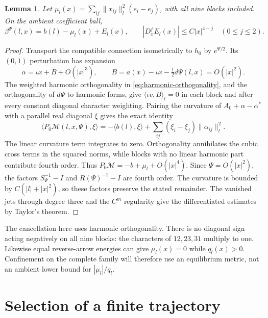 \documentclass[11pt]{amsart}
\newtheorem{lemma}[theorem]{Lemma}
\theoremstyle{definition}
\theoremstyle{remark}
\begin{document}
\begin{lemma}\label{lem:quartic-field}
Let $\mu_l(x)=\sum_{ij}\|x_{ij}\|_l^2(e_i-e_j)$, with all nine
blocks included. On the ambient coefficient ball,
\begin{equation}\label{eq:field-expansion}
 \beta^\Psi(l,x)=b(l)-\mu_l(x)+E_l(x),\qquad
 |D_x^jE_l(x)|\le C|x|^{4-j}\quad(0\le j\le2).
\end{equation}
\end{lemma}
\begin{proof}
Transport the compatible connection isometrically to $h_0$ by
$e^{\Psi/2}$. Its $(0,1)$ perturbation has expansion
\[
 \alpha=\iota x+B+O(|x|^3),\qquad
 B=a(x)-\iota x-\tfrac12d\Psi(l,x)=O(|x|^2).
\]
The weighted harmonic orthogonality in
\eqref{eq:harmonic-orthogonality}, and the orthogonality of $d\Psi$
to harmonic forms, give
$\langle\iota v,B\rangle_l=0$ in each block and after every
constant diagonal character weighting. Pairing the curvature of
$A_0+\alpha-\alpha^*$ with a parallel real diagonal $\xi$ gives
the exact identity
\begin{equation}\label{eq:projected-curvature}
 \langle P_0\mathcal M(l,x,\Psi),\xi\rangle
 =-\langle b(l),\xi\rangle
       +\sum_{ij}(\xi_i-\xi_j)\|\alpha_{ij}\|_l^2.
\end{equation}
The linear curvature term integrates to zero. Orthogonality
annihilates the cubic cross terms in the squared norms, while
blocks with no linear harmonic part contribute fourth order.
Thus $P_0\mathcal M=-b+\mu_l+O(|x|^4)$.
Since $\Psi=O(|x|^2)$, the factors $S_\Psi^{-1}-I$ and
$R(\Psi)^{-1}-I$ are fourth order. The curvature is bounded by
$C(|l|+|x|^2)$, so these factors preserve the stated remainder.
The vanished jets through degree three and the $C^m$ regularity
give the differentiated estimates by Taylor's theorem.
\end{proof}

The cancellation here uses harmonic orthogonality. There is no
diagonal sign acting negatively on all nine blocks: the characters
of $12,23,31$ multiply to one. Likewise equal reverse-arrow
energies can give $\mu_l(x)=0$ while $q_l(x)>0$.
Confinement on the complete family will therefore use an
equilibrium metric, not an ambient lower bound for $|\mu_l|/q_l$.

\section{Selection of a finite trajectory}\label{sec:abstract-phase}
\end{document}
